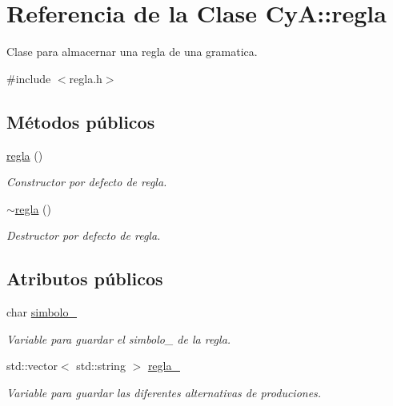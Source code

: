 \hypertarget{class_cy_a_1_1regla}{}\section{Referencia de la Clase CyA\+:\+:regla}
\label{class_cy_a_1_1regla}


Clase para almacernar una regla de una gramatica.  




{\ttfamily \#include $<$regla.\+h$>$}

\subsection*{Métodos públicos}
\begin{DoxyCompactItemize}
\item 
\mbox{\hyperlink{class_cy_a_1_1regla_aa5bc78631a7e4690fa64b393276876fb}{regla}} ()
\begin{DoxyCompactList}\small\item\em Constructor por defecto de regla. \end{DoxyCompactList}\item 
\mbox{\hyperlink{class_cy_a_1_1regla_a67058ee1235792dc7b59dce849888349}{$\sim$regla}} ()
\begin{DoxyCompactList}\small\item\em Destructor por defecto de regla. \end{DoxyCompactList}\end{DoxyCompactItemize}
\subsection*{Atributos públicos}
\begin{DoxyCompactItemize}
\item 
char \mbox{\hyperlink{class_cy_a_1_1regla_acee8a4eb2a2905af6dd1c3236261d1cc}{simbolo\+\_\+}}
\begin{DoxyCompactList}\small\item\em Variable para guardar el simbolo\+\_\+ de la regla. \end{DoxyCompactList}\item 
std\+::vector$<$ std\+::string $>$ \mbox{\hyperlink{class_cy_a_1_1regla_a7bb5b7c78939e006e12a908799d36028}{regla\+\_\+}}
\begin{DoxyCompactList}\small\item\em Variable para guardar las diferentes alternativas de produciones. \end{DoxyCompactList}\end{DoxyCompactItemize}


